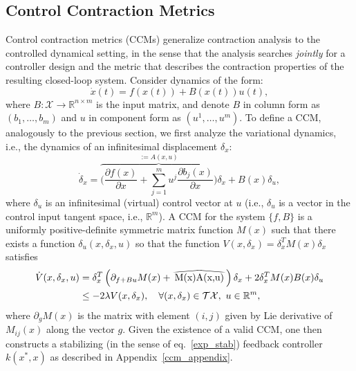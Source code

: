 \documentclass[conference]{svproc}
\newcommand\wwidehat[1]{%
\savestack{\tmpbox}{\stretchto{%
  \scaleto{%
    \scalerel*[\widthof{\ensuremath{#1}}]{\kern-.6pt\bigwedge\kern-.6pt}%
    {\rule[-\textheight/2]{1ex}{\textheight}}%
  }{\textheight}%
}{0.5ex}}%
\stackon[1pt]{#1}{\tmpbox}%
}
\newcommand{\X}{\mathcal{X}}
\newcommand{\reals}{\mathbb{R}}
\newcommand{\dx}{\delta_x}
\newcommand{\ddx}{\dot{\delta}_x}
\begin{document}
\subsection{Control Contraction Metrics}

Control contraction metrics (CCMs) generalize contraction analysis to the controlled dynamical setting, in the sense that the analysis searches \emph{jointly} for a controller design and the metric that describes the contraction properties of the resulting closed-loop system. Consider dynamics of the form:
\begin{equation}
    \dot{x}(t) = f(x(t)) + B(x(t)) u(t),
\label{dyn}
\end{equation}
where $B: \X \rightarrow \reals^{n\times m}$ is the input matrix, and denote $B$ in column form as $(b_1,\ldots,b_m)$ and $u$ in component form as $(u^1,\ldots,u^m)$. To define a CCM, analogously to the previous section, we first analyze the variational dynamics, i.e., the dynamics of an infinitesimal displacement $\delta_x$:
\begin{equation}
	\ddx= \overbrace{\bigg(\dfrac{\partial f(x)}{\partial x}  + \sum_{j=1}^m u^j \dfrac{\partial b_j(x)}{\partial x}\bigg)}^{:= A(x,u)}\delta_{x}+ B(x)\delta_{u},
\label{var_dyn_c}
\end{equation}
where $\delta_u$ is an infinitesimal (virtual) control vector at $u$ (i.e., $\delta_u$ is a vector in the control input tangent space, i.e., $\reals^m$). A CCM for the system $\{f,B\}$ is a uniformly positive-definite symmetric matrix function $M(x)$ such that there exists a function $\delta_u(x,\dx,u)$ so that the function $V(x,\dx) = \dx^T M(x) \dx$ satisfies
\begin{equation}
\begin{split}
    \dot{V}(x,\dx,u) &= \delta_{x}^{T}\left(\partial_{f+Bu}M(x)+ \wwidehat{M(x)A(x,u)} \right) \delta_{x} + 2 \delta_{x}^{T}M(x)B(x)\delta_{u} \\
    &\leq -2\lambda V(x,\dx), \quad \forall (x,\dx) \in \mathcal{T}\X,\ u \in \reals^m,
\end{split}
\label{V_dot}
\end{equation}
where $\partial_g M(x)$ is the matrix with element $(i,j)$ given by Lie derivative of $M_{ij}(x)$ along the vector $g$. Given the existence of a valid CCM, one then constructs a stabilizing (in the sense of eq.~\eqref{exp_stab}) feedback controller $k(x^*,x)$ as described in Appendix~\ref{ccm_appendix}.
\end{document}
